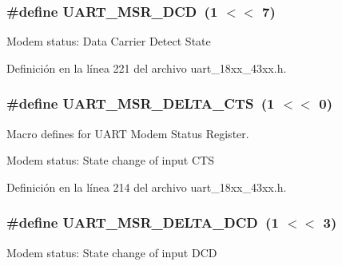 \subsubsection[{\texorpdfstring{U\+A\+R\+T\+\_\+\+M\+S\+R\+\_\+\+D\+CD}{UART_MSR_DCD}}]{\setlength{\rightskip}{0pt plus 5cm}\#define U\+A\+R\+T\+\_\+\+M\+S\+R\+\_\+\+D\+CD~(1 $<$$<$ 7)}\hypertarget{group___u_a_r_t__18_x_x__43_x_x_ga9a85f5379c5d15ebc486c4b174196afb}{}\label{group___u_a_r_t__18_x_x__43_x_x_ga9a85f5379c5d15ebc486c4b174196afb}
Modem status\+: Data Carrier Detect State 

Definición en la línea 221 del archivo uart\+\_\+18xx\+\_\+43xx.\+h.

\subsubsection[{\texorpdfstring{U\+A\+R\+T\+\_\+\+M\+S\+R\+\_\+\+D\+E\+L\+T\+A\+\_\+\+C\+TS}{UART_MSR_DELTA_CTS}}]{\setlength{\rightskip}{0pt plus 5cm}\#define U\+A\+R\+T\+\_\+\+M\+S\+R\+\_\+\+D\+E\+L\+T\+A\+\_\+\+C\+TS~(1 $<$$<$ 0)}\hypertarget{group___u_a_r_t__18_x_x__43_x_x_gad236b1cf377bf1b4600820b8a37c66ca}{}\label{group___u_a_r_t__18_x_x__43_x_x_gad236b1cf377bf1b4600820b8a37c66ca}


Macro defines for U\+A\+RT Modem Status Register. 

Modem status\+: State change of input C\+TS 

Definición en la línea 214 del archivo uart\+\_\+18xx\+\_\+43xx.\+h.

\subsubsection[{\texorpdfstring{U\+A\+R\+T\+\_\+\+M\+S\+R\+\_\+\+D\+E\+L\+T\+A\+\_\+\+D\+CD}{UART_MSR_DELTA_DCD}}]{\setlength{\rightskip}{0pt plus 5cm}\#define U\+A\+R\+T\+\_\+\+M\+S\+R\+\_\+\+D\+E\+L\+T\+A\+\_\+\+D\+CD~(1 $<$$<$ 3)}\hypertarget{group___u_a_r_t__18_x_x__43_x_x_ga0b880ad272a1356b38bb5ff30d972378}{}\label{group___u_a_r_t__18_x_x__43_x_x_ga0b880ad272a1356b38bb5ff30d972378}
Modem status\+: State change of input D\+CD 

